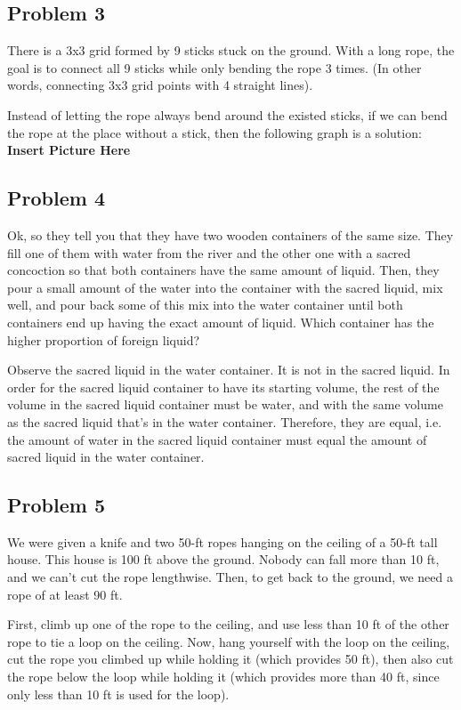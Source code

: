 \documentclass{article}
\begin{document}
\hfill

\subsection{Problem 3}
There is a 3x3 grid formed by 9 sticks stuck on the ground. With a long rope, the goal is to connect all 9 sticks while only bending the rope 3 times. 
(In other words, connecting 3x3 grid points with 4 straight lines).

Instead of letting the rope always bend around the existed sticks, if we can bend the rope at the place without a stick, then the following graph is a solution:
\textbf{Insert Picture Here}

\hfill

\subsection{Problem 4}
Ok, so they tell you that they have two wooden containers of the same size. They fill one of them with water from the river and the other one with a sacred concoction 
so that both containers have the same amount of liquid. 
Then, they pour a small amount of the water into the container with the sacred liquid, mix well, and pour back some of this mix into the water container 
until both containers end up having the exact amount of liquid. Which container has the higher proportion of foreign liquid?

Observe the sacred liquid in the water container. It is not in the sacred liquid. In order for the sacred liquid container to have its starting volume, 
the rest of the volume in the sacred liquid container must be water, and with the same volume as the sacred liquid that’s in the water container. 
Therefore, they are equal, i.e. the amount of water in the sacred liquid container must equal the amount of sacred liquid in the water container.


\hfill

\subsection{Problem 5}
We were given a knife and two 50-ft ropes hanging on the ceiling of a 50-ft tall house. This house is 100 ft above the ground. Nobody can fall more than 10 ft, 
and we can’t cut the rope lengthwise. Then, to get back to the ground, we need a rope of at least 90 ft.

First, climb up one of the rope to the ceiling, and use less than 10 ft of the other rope to tie a loop on the ceiling. 
Now, hang yourself with the loop on the ceiling, cut the rope you climbed up while holding it (which provides 50 ft), then also cut the rope below the loop while holding it 
(which provides more than 40 ft, since only less than 10 ft is used for the loop).
\end{document}

